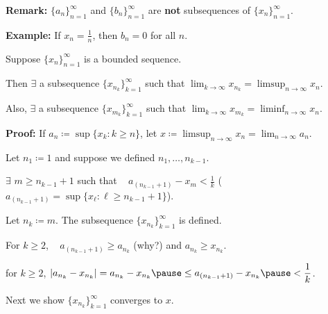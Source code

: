 \documentclass[10pt,aspectratio=169]{beamer}
\begin{document}
\begin{frame}

\textbf{Remark:} $\{ a_n \}_{n=1}^\infty$ and $\{b_n\}_{n=1}^\infty$ are
\textbf{not} subsequences of $\{x_n\}_{n=1}^\infty$.

\pause
\textbf{Example:} If $x_n = \frac{1}{n}$, then $b_n = 0$ for all $n$.

\pause
\begin{theorem}
Suppose $\{ x_n \}_{n=1}^\infty$ is a bounded sequence.

\pause
Then $\exists$ a subsequence $\{ x_{n_k} \}_{k=1}^\infty$ such that
\quad
$\displaystyle \lim_{k\to \infty} x_{n_k} = \limsup_{n \to \infty} x_n$.

\pause
Also, $\exists$ a subsequence
$\{ x_{m_k} \}_{k=1}^\infty$ such that
\quad
$\displaystyle
\lim_{k\to \infty} x_{m_k} = \liminf_{n \to \infty} x_n$.
\end{theorem}

\pause
\textbf{Proof:}
If $a_n \coloneqq \sup \{ x_k : k \geq n \}$,
let $\displaystyle x \coloneqq \limsup_{n\to\infty} x_n = \lim_{n\to\infty} a_n$.

\pause
Let $n_1 \coloneqq 1$ and suppose we defined $n_1,\ldots,n_{k-1}$.

\pause
$\exists$ $m \geq n_{k-1} + 1$ such that
~ $\displaystyle a_{(n_{k-1}+1)} - x_m < \frac{1}{k}$
\quad ($a_{(n_{k-1}+1)} = \sup \{ x_\ell : \ell \geq n_{k-1} + 1 \}$).

\pause
\medskip

Let $n_{k} \coloneqq m$.  The subsequence $\{ x_{n_k} \}_{k=1}^\infty$ is defined.

\pause
\medskip

For $k \geq 2$, ~ $a_{(n_{k-1}+1)} \geq a_{n_k}$ (why?) and $a_{n_{k}} \geq x_{n_k}$.

\pause
\thus \quad for $k \geq 2$,
\quad $\displaystyle \abs{a_{n_k} - x_{n_k}} =
a_{n_k} - x_{n_k}
\pause
\leq
a_{(n_{k-1}+1)} - x_{n_k}
\pause
< \frac{1}{k}$.

\pause
\medskip

Next we show $\{ x_{n_k} \}_{k=1}^\infty$ converges to $x$.

\end{frame}
\end{document}
